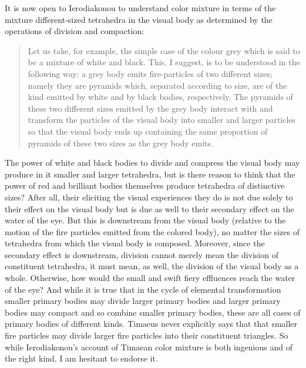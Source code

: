 It is now open to Ierodiakonou to understand color mixture in terms of the mixture different-sized tetrahedra in the visual body as determined by the operations of division and compaction:
\begin{quote}
	Let us take, for example, the simple case of the colour grey which is said to be a mixture of white and black. This, I suggest, is to be understood in the following way: a grey body emits fire-particles of two different sizes; namely they are pyramids which, separated according to size, are of the kind emitted by white and by black bodies, respectively. The pyramids of these two different sizes emitted by the grey body interact with and transform the particles of the visual body into smaller and larger particles so that the visual body ends up containing the same proportion of pyramids of these two sizes as the grey body emits. \citep[228]{Ierodiakonou:2005ly}
\end{quote}
The power of white and black bodies to divide and compress the visual body may produce in it smaller and larger tetrahedra, but is there reason to think that the power of red and brilliant bodies themselves produce tetrahedra of distinctive sizes? After all, their eliciting the visual experiences they do is not due solely to their effect on the visual body but is due as well to their secondary effect on the water of the eye. But this is downstream from the visual body (relative to the motion of the fire particles emitted from the colored body), no matter the sizes of tetrahedra from which the visual body is composed. Moreover, since the secondary effect is downstream, division cannot merely mean the division of constituent tetrahedra, it must mean, as well, the division of the visual body as a whole. Otherwise, how would the small and swift fiery effluences reach the water of the eye? And while it is true that in the cycle of elemental transformation smaller primary bodies may divide larger primary bodies and larger primary bodies may compact and so combine smaller primary bodies, these are all cases of primary bodies of different kinds. Timaeus never explicitly says that that smaller fire particles may divide larger fire particles into their constituent triangles. So while Ierodiakonou's account of Timaean color mixture is both ingenious and of the right kind, I am hesitant to endorse it. 

